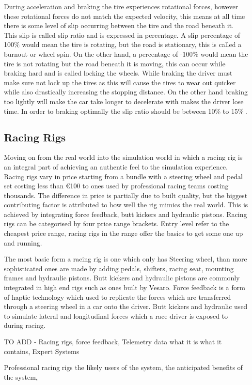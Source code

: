 During acceleration and braking the tire experiences rotational forces, however these rotational forces do not match the expected velocity, this means at all time there is some level of slip occurring between the tire and the road beneath it. This slip is called slip ratio and is expressed in percentage. A slip percentage of 100\% would mean the tire is rotating, but the road is stationary, this is called a burnout or wheel spin. On the other hand, a percentage of -100\% would mean the tire is not rotating but the road beneath it is moving, this can occur while braking hard and is called locking the wheels\cite{pacejka2006tire}. While braking the driver must make sure not lock up the tires as this will cause the tires to wear out quicker while also drastically increasing the stopping distance. On the other hand braking too lightly will make the car take longer to decelerate with makes the driver lose time. In order to braking optimally the slip ratio should be between 10\% to 15\% \cite{GoingFaster}.

\subsection{Racing Rigs}

Moving on from the real world into the simulation world in which a racing rig is an integral part of achieving an authentic feel to the simulation experience. Racing rigs vary in price starting from a bundle with a steering wheel and pedal set costing less than €100 to ones used by professional racing teams costing thousands. The difference in price is partially due to built quality, but the biggest contributing factor is attributed to how well the rig mimics the real world. This is achieved by integrating force feedback, butt kickers and hydraulic pistons. Racing rigs can be categorised by four price range brackets. Entry level refer to the cheapest price range, racing rigs in the range offer the basics to get some one up and running.

The most basic form a racing rig is one which only has Steering wheel, than more sophisticated ones are made by adding pedals, shifters, racing seat, mounting frames and hydraulic pistons. Butt kickers and hydraulic pistons are commonly integrated in high end rigs such as ones built by Vesaro. Force feedback is a form of haptic technology which used to replicate the forces which are transferred through a steering wheel in a car onto the driver\cite{li2015can}. Butt kickers and hydraulic used to simulate lateral and longitudinal forces which a race driver is exposed to during racing.



TO ADD - Racing rigs, force feedback, Telemetry data what it is what it contains, Expert Systems

Professional racing rigs
the likely users of the system,
the anticipated benefits of the system,







